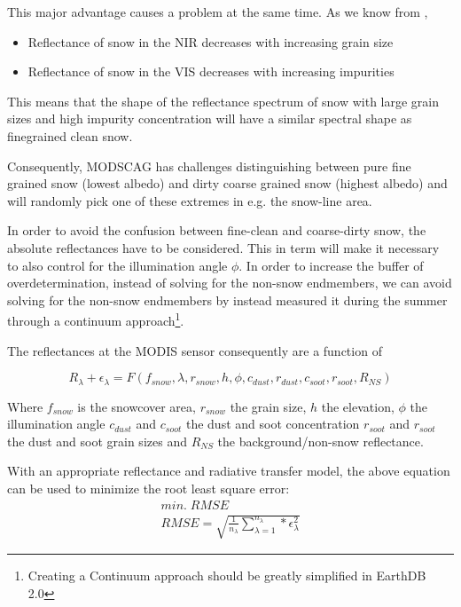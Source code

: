 \documentclass[letterpaper, parskip=half]{scrartcl}
\begin{document}
This major advantage causes a problem at the same time. As we know from \cite{Warren1982}, 

\begin{itemize}
 \item Reflectance of snow in the NIR decreases with increasing grain size
 \item Reflectance of snow in the VIS decreases with increasing impurities
\end{itemize}

This means that the shape of the reflectance spectrum of 
snow with large grain sizes and high impurity concentration will have a similar spectral shape as finegrained clean snow.

Consequently, \gls{MODSCAG} has challenges distinguishing between pure fine grained snow (lowest albedo) and dirty coarse grained snow (highest albedo) and will randomly pick one of these extremes in e.g. the snow-line area.

In order to avoid the confusion between fine-clean and coarse-dirty snow, the absolute reflectances have to be considered.
This in term will make it necessary to also control for the illumination angle $\phi$.
In order to increase the buffer of overdetermination, instead of solving for the non-snow endmembers, we can avoid solving for the non-snow endmembers by instead measured it during the summer through a continuum approach\footnote{Creating a Continuum approach should be greatly simplified in EarthDB 2.0}.

The reflectances at the MODIS sensor consequently are a function of

\begin{equation}
    R_{\lambda} + \epsilon_{\lambda} = F(f_{snow}, \lambda, r_{snow}, h, \phi, c_{dust}, r_{dust}, c_{soot}, r_{soot}, R_{NS})
\end{equation}

Where $f_{snow}$ is the snowcover area, 
$r_{snow}$ the grain size, 
$h$ the elevation,  
$\phi$ the illumination angle 
$c_{dust}$ and $c_{soot}$ the dust and soot concentration
$r_{soot}$ and $r_{soot}$ the dust and soot grain sizes
and $R_{NS}$ the background/non-snow reflectance.

With an appropriate reflectance and radiative transfer model, the above equation can be used to minimize the root least square error:
\begin{equation}
\begin{split}
min.\; RMSE \\
 RMSE = \sqrt{ \frac{1}{n_{\lambda}} \sum_{\lambda=1}^{n_\lambda} * \epsilon_{\lambda}^2}
 \end{split}
\end{equation}
\end{document}
